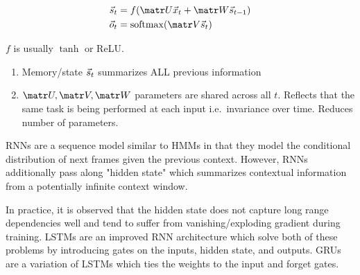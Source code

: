 \begin{align}
    \s_t &= f(\U \x_t + \W \s_{t-1}) \\
    \o_t &= \softmax( \V \s_t)
\end{align}

$f$ is usually $\tanh$ or ReLU.

\begin{enumerate}
    \item Memory/state $\vec{s}_t$ summarizes ALL previous information
    \item $\U, \V, \W$ parameters are shared across all $t$. Reflects
        that the same task is being performed at each input i.e.\
        invariance over time. Reduces number of parameters.
\end{enumerate}


RNNs are a sequence model similar to HMMs in that they model the conditional
distribution of next frames given the previous context. However, RNNs additionally
pass along "hidden state" which summarizes contextual information from a potentially
infinite context window.

In practice, it is observed that the hidden state does not capture long range
dependencies well and tend to suffer from vanishing/exploding gradient during
training. LSTMs are an improved RNN architecture which solve both of these
problems by introducing gates on the inputs, hidden state, and outputs. GRUs are
a variation of LSTMs which ties the weights to the input and forget gates.

